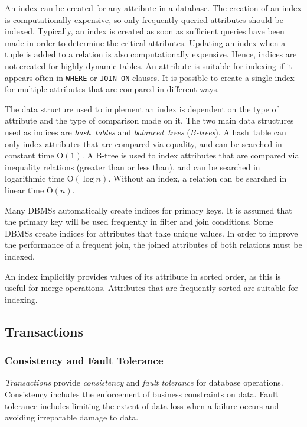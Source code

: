 An index can be created for any attribute in a database.
The creation of an index is computationally expensive, so only frequently queried attributes should be indexed.
Typically, an index is created as soon as sufficient queries have been made in order to determine the critical attributes.
Updating an index when a tuple is added to a relation is also computationally expensive.
Hence, indices are not created for highly dynamic tables.
An attribute is suitable for indexing if it appears often in \texttt{WHERE} or \texttt{JOIN ON} clauses.
It is possible to create a single index for multiple attributes that are compared in different ways.

The data structure used to implement an index is dependent on the type of attribute and the type of comparison made on it.
The two main data structures used as indices are \emph{hash~tables} and \emph{balanced~trees} (\emph{B-trees}).
A hash~table can only index attributes that are compared via equality, and can be searched in constant time \( \mathrm{O}\!\left( 1 \right) \).
A B-tree is used to index attributes that are compared via inequality relations (greater than or less than), and can be searched in logarithmic time \( \mathrm{O}\!\left( \log n \right) \).
Without an index, a relation can be searched in linear time \( \mathrm{O}\!\left( n \right) \).

Many DBMSs automatically create indices for primary keys.
It is assumed that the primary key will be used frequently in filter and join conditions.
Some DBMSs create indices for attributes that take unique values.
In order to improve the performance of a frequent join, the joined attributes of both relations must be indexed.

An index implicitly provides values of its attribute in sorted order, as this is useful for merge operations.
Attributes that are frequently sorted are suitable for indexing.

\subsection{Transactions}

\subsubsection{Consistency and Fault Tolerance}

\emph{Transactions} provide \emph{consistency} and \emph{fault tolerance} for database operations.
Consistency includes the enforcement of business constraints on data.
Fault tolerance includes limiting the extent of data loss when a failure occurs and avoiding irreparable damage to data.


